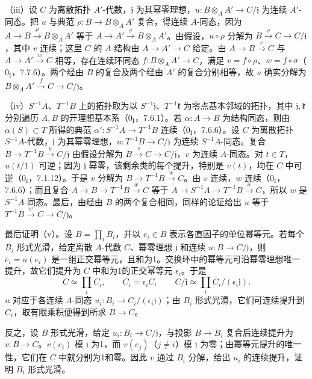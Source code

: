 （iii）设 $C$ 为离散拓扑 $A'$-代数，$\mathfrak j$ 为其幂零理想，$u:B\otimes_AA'\to C/\mathfrak j$ 为连续 $A'$-同态。把 $u$ 与典范 $\rho:B\to B\otimes_AA'$ 复合，得连续 $A$-同态，因为 $A\to B\xrightarrow{\rho}B\otimes_AA'$ 等于 $A\to A'\xrightarrow{\sigma}B\otimes_AA'$。由假设，$u\circ\rho$ 分解为 $B\xrightarrow{v}C\to C/\mathfrak j$，其中 $v$ 连续；这里 $C$ 的 $A$-结构由 $A\to A'\to C$ 给定。由 $A\to B\xrightarrow{v}C$ 与 $A\to A'\xrightarrow{w}C$ 相等，存在连续环同态 $f:B\otimes_AA'\to C$，满足 $v=f\circ\rho$、$w=f\circ\sigma$（$0_{\mathrm I}$，7.7.6）。两个经由 $B$ 的复合及两个经由 $A'$ 的复合分别相等，故 $u$ 确实分解为 $B\otimes_AA'\xrightarrow{f}C\to C/\mathfrak j$。

（iv）$S^{-1}A$、$T^{-1}B$ 上的拓扑取为以 $S^{-1}\mathfrak j$、$T^{-1}\mathfrak k$ 为零点基本邻域的拓扑，其中 $\mathfrak j,\mathfrak k$ 分别遍历 $A,B$ 的开理想基本系（$0_{\mathrm I}$，7.6.1）。若 $\alpha:A\to B$ 为结构同态，则由 $\alpha(S)\subset T$ 所得的典范 $\alpha':S^{-1}A\to T^{-1}B$ 连续（$0_{\mathrm I}$，7.6.6）。设 $C$ 为离散拓扑 $S^{-1}A$-代数，$\mathfrak j$ 为其幂零理想，$u:T^{-1}B\to C/\mathfrak j$ 为连续 $S^{-1}A$-同态。复合 $B\to T^{-1}B\xrightarrow{u}C/\mathfrak j$ 由假设分解为 $B\xrightarrow{v}C\to C/\mathfrak j$，$v$ 为连续 $A$-同态。对 $t\in T$，$u(t/1)$ 可逆；因为 $\mathfrak j$ 幂零，该剩余类的每个提升，特别是 $v(t)$，均在 $C$ 中可逆（$0_{\mathrm I}$，7.1.12）。于是 $v$ 分解为 $B\to T^{-1}B\xrightarrow{w}C$。由 $v$ 连续，$w$ 连续（$0_{\mathrm I}$，7.6.6）；而且复合 $A\to B\to T^{-1}B\xrightarrow{w}C$ 等于 $A\to S^{-1}A\to T^{-1}B\xrightarrow{w}C$，所以 $w$ 是 $S^{-1}A$-同态。最后，由经由 $B$ 的两个复合相同，同样的论证给出 $u$ 等于 $T^{-1}B\xrightarrow{w}C\to C/\mathfrak j$。

最后证明（v）。设 $B=\prod_i B_i$，并以 $e_i\in B$ 表示各直因子的单位幂等元。若每个 $B_i$ 形式光滑，给定离散 $A$-代数 $C$、幂零理想 $\mathfrak j$ 和连续 $u:B\to C/\mathfrak j$，则 $\bar e_i=u(e_i)$ 是一组正交幂等元，且和为1。交换环中的幂等元可沿幂零理想唯一提升，故它们提升为 $C$ 中和为1的正交幂等元 $\epsilon_i$。于是
\[
 C\simeq\prod_i C_i,\qquad C_i=\epsilon_i C,
 \qquad C/\mathfrak j\simeq\prod_i C_i/(\epsilon_i\mathfrak j).
\]
$u$ 对应于各连续 $A$-同态 $u_i:B_i\to C_i/(\epsilon_i\mathfrak j)$；由 $B_i$ 形式光滑，它们可连续提升到 $C_i$，取有限乘积便得到所求 $B\to C$。

反之，设 $B$ 形式光滑，给定 $u_i:B_i\to C/\mathfrak j$，与投影 $B\to B_i$ 复合后连续提升为 $v:B\to C$。$v(e_i)$ 模 $\mathfrak j$ 为1，而 $v(e_j)$（$j\ne i$）模 $\mathfrak j$ 为零；由幂等元提升的唯一性，它们在 $C$ 中就分别为1和零。因此 $v$ 通过 $B_i$ 分解，给出 $u_i$ 的连续提升，证明 $B_i$ 形式光滑。

